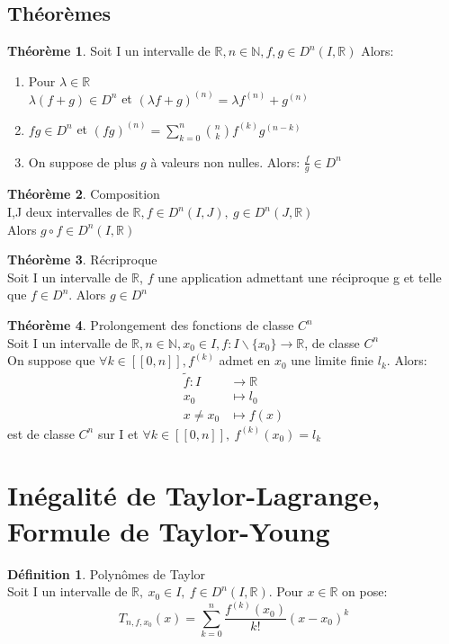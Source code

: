 \documentclass[fleqn]{article}
\theoremstyle{definition} \newtheorem*{defi}{D\'efinition}
\theoremstyle{definition} \newtheorem*{theo}{Th\'eor\`eme}
\theoremstyle{remark} \newtheorem*{rqs}{Remarques}
\theoremstyle{definition} \newtheorem*{prop}{Propri\'et\'e}
\begin{document}
\subsection{Th\'eor\`emes}
\begin{theo}
	Soit I un intervalle de $\mathbb{R}, n \in \mathbb{N}, f,g \in D^n(I, \mathbb{R})$ Alors:
	\begin{enumerate}
		\item Pour $\lambda \in \mathbb{R}$ \\
			$\lambda (f + g) \in D^n$ et $(\lambda f + g)^{(n)} = \lambda f^{(n)} + g^{(n)}$
		\item $fg \in D^n$ et $(fg)^{(n)} = \sum_{k=0}^{n} \binom{n}{k} f^{(k)} g ^{(n-k)}$
		\item On suppose de plus $g$ \`a valeurs non nulles. Alors: $\frac{f}{g} \in D^n$
	\end{enumerate}
\end{theo}

\begin{theo} Composition\\
	I,J deux intervalles de $\mathbb{R}, f \in D^n(I, J),\ g \in D^n(J, \mathbb{R})$\\
	Alors $g \circ f \in D^n(I, \mathbb{R})$
\end{theo}

\begin{theo} R\'ecriproque\\
	Soit I un intervalle de $\mathbb{R}$, $f$ une application admettant une r\'eciproque g et telle que $f \in D^n$. Alors $g \in D^n$
\end{theo}

\begin{theo} Prolongement des fonctions de classe $C^n$\\
	Soit I un intervalle de $\mathbb{R}, n \in \mathbb{N}, x_0 \in I, f:I\backslash\{x_0\} \rightarrow \mathbb{R}$, de classe $C^n$ \\
	On suppose que $\forall k \in [\![0,n]\!], f^{(k)}$ admet en $x_0$ une limite finie $l_k$. Alors:
	\begin{align*}
		\tilde{f}: I &\rightarrow \mathbb{R}\\
		x_0 &\mapsto l_0\\
		x \neq x_0 &\mapsto f(x)
	\end{align*}
	est de classe $C^n$ sur I et $\forall k \in [\![0,n]\!],\ f^{(k)}(x_0) = l_k$
\end{theo}

\section{In\'egalit\'e de Taylor-Lagrange, Formule de Taylor-Young}
\begin{defi} Polyn\^omes de Taylor \\
	Soit I un intervalle de $\mathbb{R},\ x_0 \in I,\ f \in D^n(I, \mathbb{R})$. Pour $x \in \mathbb{R}$ on pose:
	\[T_{n,f,x_0}(x) = \sum_{k=0}^{n} \frac{f^{(k)}(x_0)}{k!}(x-x_0)^k\]
\end{defi}
\end{document}
